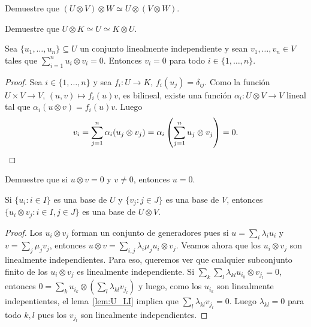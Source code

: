 \begin{exercise}
	\label{xca:UxVxW}
	Demuestre que $(U\otimes V)\otimes W\simeq U\otimes(V\otimes W)$.
\end{exercise}

\begin{exercise}
	\label{xca:UxK}
	Demuestre que $U\otimes K\simeq U\simeq K\otimes U$.
\end{exercise}

\begin{lemma}
	\label{lem:U_LI}
	Sea $\{u_1,\dots,u_n\}\subseteq U$ un conjunto linealmente independiente y
	sean $v_1,\dots,v_n\in V$ tales que $\sum_{i=1}^n u_i\otimes v_i=0$.
	Entonces $v_i=0$ para todo $i\in\{1,\dots,n\}$.
\end{lemma}

\begin{proof}
	Sea $i\in\{1,\dots,n\}$ y sea $f_i\colon U\to K$, $f_i(u_j)=\delta_{ij}$.
	Como la función $U\times V\to V$, $(u,v)\mapsto f_i(u)v$, es bilineal, existe una función
	$\alpha_i\colon U\otimes V\to V$ lineal tal que $\alpha_i(u\otimes
	v)=f_i(u)v$. Luego
	\[
		v_i=\sum_{j=1}^n\alpha_i(u_j\otimes v_j)=\alpha_i\left(\sum_{j=1}^nu_j\otimes v_j\right)=0.\qedhere
	\]
\end{proof}

\begin{exercise}
	\label{xca:uxv=0}
	Demuestre que si $u\otimes v=0$ y $v\ne 0$, entonces $u=0$.
\end{exercise}

\begin{theorem}
	Si $\{u_i:i\in I\}$ es una base de $U$ y $\{v_j:j\in J\}$ es una base de
	$V$, entonces $\{u_i\otimes v_j:i\in I,j\in J\}$ es una base de $U\otimes
	V$.
\end{theorem}

\begin{proof}
	Los $u_i\otimes v_j$ forman un conjunto de generadores pues  
	si $u=\sum_i\lambda_iu_i$ y $v=\sum_j\mu_jv_j$, entonces
	$u\otimes v=\sum_{i,j}\lambda_i\mu_ju_i\otimes v_j$. 
	Veamos ahora que los $u_i\otimes v_j$ son linealmente independientes. Para
	eso, queremos ver que cualquier subconjunto finito de los $u_i\otimes v_j$
	es linealmente independiente. Si $\sum_k\sum_l\lambda_{kl}u_{i_k}\otimes
	v_{j_l}=0$, entonces
	$0=\sum_{k}u_{i_k}\otimes\left(\sum_{l}\lambda_{kl}v_{j_l}\right)$ y luego,
	como los $u_{i_k}$ son linealmente indepentientes, el lema~\ref{lem:U_LI}
	implica que $\sum_{l}\lambda_{kl}v_{j_l}=0$. Luego $\lambda_{kl}=0$ para
	todo $k,l$ pues los $v_{j_l}$ son linealmente independientes.
\end{proof}

